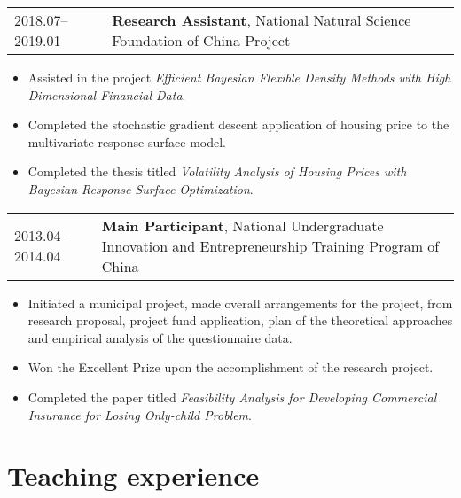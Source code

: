\documentclass[10pt,a4paper,]{article}
\providecommand{\tightlist}{%
  \setlength{\itemsep}{0pt}\setlength{\parskip}{0pt}}
\begin{document}
\begin{tabular}{ll}
  2018.07--2019.01 & \textbf{Research Assistant}, National Natural Science Foundation of China Project \\ 
  \end{tabular}

\begin{itemize}
\tightlist
\item
  Assisted in the project \emph{Efficient Bayesian Flexible Density
  Methods with High Dimensional Financial Data}.
\item
  Completed the stochastic gradient descent application of housing price
  to the multivariate response surface model.
\item
  Completed the thesis titled \emph{Volatility Analysis of Housing
  Prices with Bayesian Response Surface Optimization}.
\end{itemize}

\begin{tabular}{ll}
  2013.04--2014.04 & \textbf{Main Participant}, National Undergraduate Innovation and Entrepreneurship Training Program of China \\ 
  \end{tabular}

\begin{itemize}
\tightlist
\item
  Initiated a municipal project, made overall arrangements for the
  project, from research proposal, project fund application, plan of the
  theoretical approaches and empirical analysis of the questionnaire
  data.
\item
  Won the Excellent Prize upon the accomplishment of the research
  project.
\item
  Completed the paper titled \emph{Feasibility Analysis for Developing
  Commercial Insurance for Losing Only-child Problem}.
\end{itemize}

\hypertarget{teaching-experience}{%
\section{Teaching experience}\label{teaching-experience}}
\end{document}
